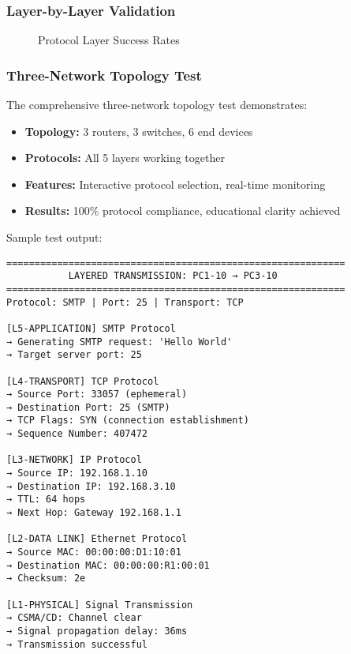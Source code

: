 \documentclass[12pt,a4paper]{article}
\begin{document}
\subsubsection{Layer-by-Layer Validation}

\begin{figure}[H]
\centering
{}
\caption{Protocol Layer Success Rates}
\end{figure}

\subsubsection{Three-Network Topology Test}

The comprehensive three-network topology test demonstrates:

\begin{itemize}
\item \textbf{Topology:} 3 routers, 3 switches, 6 end devices
\item \textbf{Protocols:} All 5 layers working together
\item \textbf{Features:} Interactive protocol selection, real-time monitoring
\item \textbf{Results:} 100\% protocol compliance, educational clarity achieved
\end{itemize}

Sample test output:
\begin{lstlisting}[caption=Three-Network Test Output]
============================================================
           LAYERED TRANSMISSION: PC1-10 → PC3-10
============================================================
Protocol: SMTP | Port: 25 | Transport: TCP

[L5-APPLICATION] SMTP Protocol
→ Generating SMTP request: 'Hello World'
→ Target server port: 25

[L4-TRANSPORT] TCP Protocol  
→ Source Port: 33057 (ephemeral)
→ Destination Port: 25 (SMTP)
→ TCP Flags: SYN (connection establishment)
→ Sequence Number: 407472

[L3-NETWORK] IP Protocol
→ Source IP: 192.168.1.10
→ Destination IP: 192.168.3.10  
→ TTL: 64 hops
→ Next Hop: Gateway 192.168.1.1

[L2-DATA LINK] Ethernet Protocol
→ Source MAC: 00:00:00:D1:10:01
→ Destination MAC: 00:00:00:R1:00:01
→ Checksum: 2e

[L1-PHYSICAL] Signal Transmission
→ CSMA/CD: Channel clear
→ Signal propagation delay: 36ms
→ Transmission successful
\end{lstlisting}
\end{document}
